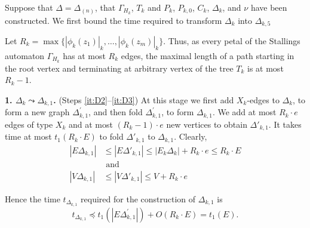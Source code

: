 \documentclass[a4paper,12pt]{article}
\newcommand{\G}{\Gamma }
\newcommand{\D}{\Delta }
\newtheorem{lemma}[theorem]{Lemma}
\numberwithin{equation}{section}
\numberwithin{figure}{section}
\begin{document}

Suppose that $\D = \D_{(n)}$,
that $\G_{H_k}$, $T_k$ and $P_k$, $P_{k,0}$,  $C_k$, $\D_k$, and $\nu$  have been
constructed. We first bound 
the time required to transform $\D_k$ into $\D_{k,5}$

Let $R_k  = \max \{ |\phi_k(z_1)|_k, \ldots, |\phi_k(z_m)|_k\}$. Thus, as
every petal of the Stallings automaton $\G_{H_k}$ has at most $R_k$
edges, the maximal length of a path starting in the root vertex
and terminating at arbitrary vertex of the tree $T_k$ is at most
$R_k-1$.

{\bf 1. $\D_k \leadsto \D_{k,1}$.}  (Steps \ref{it:D2}--\ref{it:D3}) At this stage we first add
$X_k$-edges to $\D_k$, to form a new graph $\D^\prime_{k,1}$, and then
fold $\D^\prime_{k,1}$, to form $\D_{k,1}$.  We add at most $R_k \cdot e$
edges of type $X_k$ and at most $(R_k-1)\cdot e$ new vertices to
obtain $\D'_{k,1}$. It takes time at most $t_1(R_k \cdot E )$ to fold
$\D'_{k,1}$ to  $\D_{k,1}$. Clearly,
\begin{equation}\label{evth1}
\begin{split}
|E\D_{k,1} | &\le |E\D'_{k,1} | \le |E_k\D_k | + R_k \cdot e \le
R_k \cdot E\\
&{\textrm{ and }}\\
|V \D_{k,1}| &\le |V \D'_{k,1} | \le V + R_k\cdot e
\end{split}
\end{equation}


Hence the time $t_{\D_{k,1}}$ required for the construction of $\D_{k,1}$
is
\begin{equation}\label{theta1}
t_{\D_{k,1}} \preceq t_1(|E \D_{k,1}^\prime |) + O(R_k \cdot E) =t_1( E) .
\end{equation}
\end{document}
